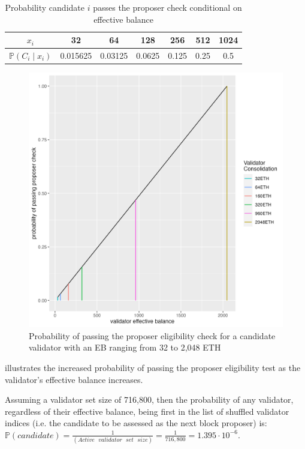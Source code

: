 \documentclass[submission,copyright,creativecommons]{eptcs}
\newcommand{\eb}{x}
\newcommand{\prob}{\mathbb P}
\begin{document}
\begin{table}[htp]
\begin{center}
\caption{Probability candidate $i$ passes the proposer check conditional on
effective balance}
\renewcommand{\arraystretch}{1.3}
\begin{tabular}{c|c|c|c|c|c|c}
  \hline
  $\eb_i$
  & 32 & 64 & 128 & 256 & 512 & 1024\\
  \hline
  $\prob(C_i \mid \eb_i)$&
  0.015625 & 0.03125 & 0.0625 & 0.125 & 0.25 & 0.5\\
  \hline
\end{tabular}
\end{center}
\end{table}
\begin{figure}[htbp]
\begin{center}
\includegraphics[width=0.8\linewidth]{images/proposer_check_graph}
\caption{Probability of passing the proposer eligibility check for a candidate validator with an EB ranging from 32 to 2,048 ETH}
\label{fig:proposerEB}
\end{center}
\end{figure}
 illustrates the increased probability of passing the proposer eligibility test as
the validator's effective balance increases.

Assuming a validator set size of 716,800, then the probability of any
validator, regardless of their effective balance, being first in the list of
shuffled validator indices (i.e. the candidate to be assessed as the next block
proposer) is: \\
$\prob(candidate) = \frac{1}{(Active \texttt{ } validator \texttt{ } set \texttt{ }
size)} = \frac{1}{ 716,800} = 1.395 \cdot 10^{-6}$.
\end{document}
